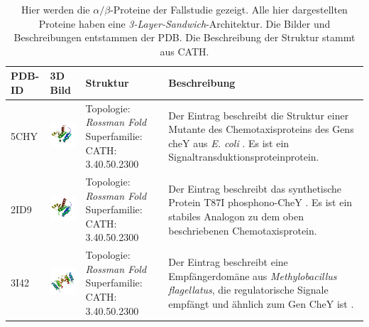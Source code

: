 \documentclass{article}
\begin{document}
\begin{table}
\begin{center}
\caption{Hier werden die $\alpha/\beta$-Proteine der Fallstudie gezeigt. Alle hier dargestellten Proteine haben eine \textit{3-Layer-Sandwich}-Architektur. Die Bilder und Beschreibungen entstammen der PDB. Die Beschreibung der Struktur stammt aus CATH.}
\begin{tabular}{ | C{9mm} | C{30mm} | C{29mm} | C{38mm} | }
\hline
PDB-ID & 3D Bild & Struktur & Beschreibung \\ \hline
5CHY  & \includegraphics[width=30mm, trim= -10 -5 -5 -10]{5CHY_bio_r_500.jpg} & Topologie: \newline \textit{\textit{Rossman Fold}} \newline Superfamilie: CATH: 3.40.50.2300 & Der Eintrag beschreibt die Struktur einer Mutante des Chemotaxisproteins des Gens cheY aus \textit{E. coli} \cite{5chy}. Es ist ein Signaltransduktionsproteinprotein. \\ \hline
2ID9  & \includegraphics[width=30mm, trim= -10 -5 -5 -10]{2ID9_bio_r_500.jpg} & Topologie: \newline \textit{\textit{Rossman Fold}} \newline Superfamilie: CATH: 3.40.50.2300  & Der Eintrag beschreibt das synthetische Protein T87I phosphono-CheY \cite{2id9}. Es ist ein stabiles Analogon zu dem oben beschriebenen Chemotaxisprotein. \\ \hline
3I42  & \includegraphics[width=30mm, trim= -10 -5 -5 -10]{3I42_bio_r_500.jpg} & Topologie: \newline \textit{\textit{Rossman Fold}} \newline Superfamilie: CATH: 3.40.50.2300  & Der Eintrag beschreibt eine Empfängerdom\"ane aus \textit{Methylobacillus flagellatus}, die regulatorische Signale empf\"angt und \"ahnlich zum Gen CheY ist \cite{3i42}.  \\ \hline

\end{tabular}
\end{center}
\end{table}
\end{document}
